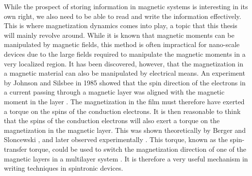 While the prospect of storing information in magnetic systems is interesting in its own right, we also need to be able to read and write the information effectively. This is where magnetization dynamics comes into play, a topic that this thesis will mainly revolve around. While it is known that magnetic moments can be manipulated by magnetic fields, this method is often impractical for nano-scale devices due to the large fields required to manipulate the magnetic moments in a very localized region. It has been discovered, however, that the magnetization in a magnetic material can also be manipulated by electrical means. An experiment by Johnson and Silsbee in 1985 showed that the spin direction of the electrons in a current passing through a magnetic layer was aligned with the magnetic moment in the layer \cite{JohnsonSilsbee1985}. The magnetization in the film must therefore have exerted a torque on the spins of the conduction electrons. It is then reasonable to think that the spins of the conduction electrons will also exert a torque on the magnetization in the magnetic layer. This was shown theoretically by Berger \cite{Berger1978,Berger1984,Berger1992,Berger1996} and Sloncewski \cite{Slonczewski1996}, and later observed experimentally \cite{Tsoi1998}. This torque, known as the spin-transfer torque, could be used to switch the magnetization direction of one of the magnetic layers in a multilayer system \cite{Myers1999,Sun1999,Katine2000}. It is therefore a very useful mechanism in writing techniques in spintronic devices. 

